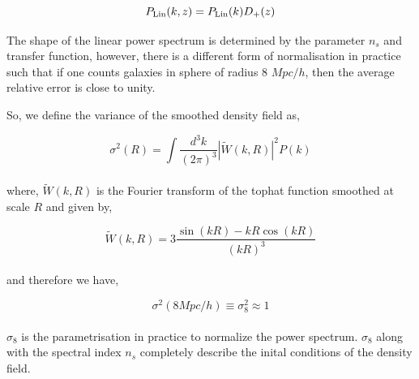 \begin{equation}
	P_{\rm Lin}(k,z) = P_{\rm Lin}(k) D_+(z)
\end{equation}

The shape of the linear power spectrum is determined by the parameter $n_s$ and 
transfer function, however, there is a different form of normalisation in 
practice such that if one counts galaxies in sphere of radius 8 $Mpc/h$, then
the average relative error is close to unity. 

So, we define the variance of the smoothed density field as,

\begin{equation}
	\sigma^2(R) = \int \dfrac{d^3k}{(2\pi)^3} |\tilde{W}(k,R)|^2 P(k)
\end{equation}
\\
where, $\tilde{W}(k,R)$ is the Fourier transform of the tophat function smoothed 
at scale $R$ and given by,

\begin{equation}
	\tilde{W}(k,R) = 3\dfrac{\sin(kR) - kR \cos(kR)}{(kR)^3}
\end{equation}
\\
and therefore we have,

\begin{equation}
	\sigma^2(8 Mpc/h) \equiv \sigma_8^2 \approx 1
\end{equation}
\\
$\sigma_8$ is the parametrisation in practice to normalize the power
spectrum. $\sigma_8$ along with the spectral index $n_s$ completely
describe the inital conditions of the density field.

